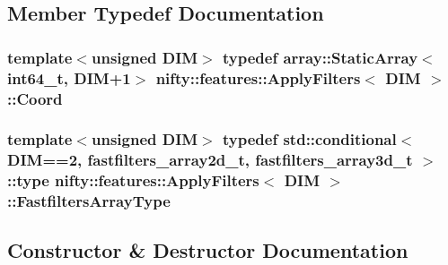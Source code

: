 \subsection{Member Typedef Documentation}
\hypertarget{structnifty_1_1features_1_1ApplyFilters_a0a26d161f300b3394044f1357ae5ebfd}{}
\subsubsection[{Coord}]{\setlength{\rightskip}{0pt plus 5cm}template$<$unsigned D\+I\+M$>$ typedef {\bf array\+::\+Static\+Array}$<$int64\+\_\+t, D\+I\+M+1$>$ {\bf nifty\+::features\+::\+Apply\+Filters}$<$ D\+I\+M $>$\+::{\bf Coord}}\label{structnifty_1_1features_1_1ApplyFilters_a0a26d161f300b3394044f1357ae5ebfd}
\hypertarget{structnifty_1_1features_1_1ApplyFilters_adfddd3f0fdaa0179cc23100901565774}{}
\subsubsection[{Fastfilters\+Array\+Type}]{\setlength{\rightskip}{0pt plus 5cm}template$<$unsigned D\+I\+M$>$ typedef std\+::conditional$<$D\+I\+M==2, fastfilters\+\_\+array2d\+\_\+t, fastfilters\+\_\+array3d\+\_\+t $>$\+::type {\bf nifty\+::features\+::\+Apply\+Filters}$<$ D\+I\+M $>$\+::{\bf Fastfilters\+Array\+Type}}\label{structnifty_1_1features_1_1ApplyFilters_adfddd3f0fdaa0179cc23100901565774}


\subsection{Constructor \& Destructor Documentation}
\hypertarget{structnifty_1_1features_1_1ApplyFilters_a21bb107c65ee2783993d6de3170d2922}{}
